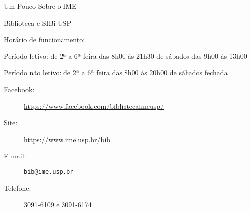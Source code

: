\begin{secao}{Um Pouco Sobre o IME}
\begin{subsecao}{Biblioteca e SIBi-USP}
\begin{subsubsecao}{Horário de funcionamento:}

Período letivo: de 2ª a 6ª feira das 8h00 às 21h30 \newline
\phantom{Período letivo: }de sábados das 9h00 às 13h00

Período não letivo: de 2ª a 6ª feira das 8h00 às 20h00 \newline
\phantom{Período não letivo: }de sábados fechada 
\end{subsubsecao}
\begin{description}
  \item[Facebook:] \url{https://www.facebook.com/bibliotecaimeusp/}
  \item[Site:] \url{https://www.ime.usp.br/bib}
  \item[E-mail:] \texttt{bib@ime.usp.br}
  \item[Telefone:] 3091-6109 e 3091-6174
\end{description}

\end{subsecao}
\end{secao}

